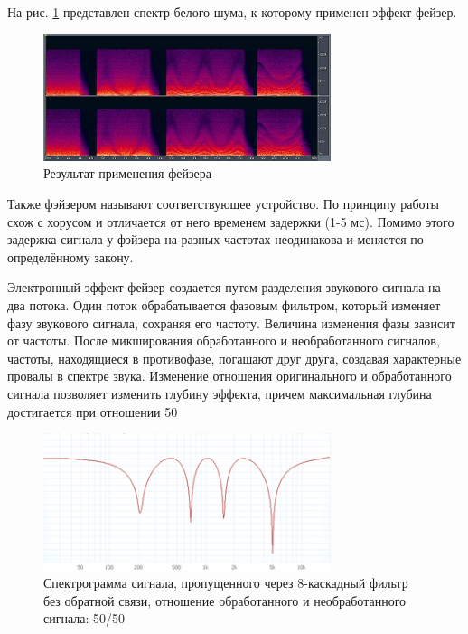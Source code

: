 \documentclass[oneside, final, 14pt]{extreport}
\begin{document}
На рис. \ref{pic-phaser-03} представлен спектр белого шума, к которому применен эффект фейзер.

\begin{figure}[h!]
  \centering
  \includegraphics[width=0.75\textwidth]{pic-phaser-03}
  \caption{Результат применения фейзера}
  \label{pic-phaser-03}
\end{figure}

Также фэйзером называют соответствующее устройство. По принципу работы схож с хорусом и отличается от него временем задержки (1-5 мс). Помимо этого задержка сигнала у фэйзера на разных частотах неодинакова и меняется по определённому закону.

Электронный эффект фейзер создается путем разделения звукового сигнала на два потока. Один поток обрабатывается фазовым фильтром, который изменяет фазу звукового сигнала, сохраняя его частоту. Величина изменения фазы зависит от частоты. После микширования обработанного и необработанного сигналов, частоты, находящиеся в противофазе, погашают друг друга, создавая характерные провалы в спектре звука. Изменение отношения оригинального и обработанного сигнала позволяет изменить глубину эффекта, причем максимальная глубина достигается при отношении 50%

\begin{figure}[h!]
  \centering
  \includegraphics[width=0.75\textwidth]{pic-phaser-01}
  \caption{Спектрограмма сигнала, пропущенного через 8-каскадный фильтр без обратной связи, отношение обработанного и необработанного сигнала: 50/50}
  \label{pic-phaser-01}
\end{figure}
\end{document}
